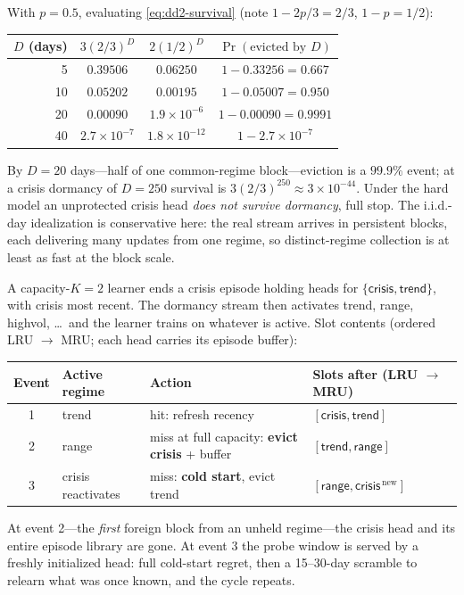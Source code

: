 \begin{example}
With $p = 0.5$, evaluating \eqref{eq:dd2-survival} (note
$1 - 2p/3 = 2/3$, $1 - p = 1/2$):

\begin{center}
\begin{tabular}{rccc}
\toprule
$D$ (days) & $3(2/3)^D$ & $2(1/2)^D$ & $\Pr(\text{evicted by } D)$ \\
\midrule
5  & $0.39506$ & $0.06250$  & $1 - 0.33256 = 0.667$ \\
10 & $0.05202$ & $0.00195$  & $1 - 0.05007 = 0.950$ \\
20 & $0.00090$ & $1.9\times 10^{-6}$ & $1 - 0.00090 = 0.9991$ \\
40 & $2.7\times 10^{-7}$ & $1.8\times 10^{-12}$ & $1 - 2.7\times 10^{-7}$ \\
\bottomrule
\end{tabular}
\end{center}

By $D = 20$ days---half of one common-regime block---eviction is a $99.9\%$
event; at a crisis dormancy of $D = 250$ survival is
$3(2/3)^{250} \approx 3 \times 10^{-44}$. Under the hard model an
unprotected crisis head \emph{does not survive dormancy}, full stop. The
i.i.d.-day idealization is conservative here: the real stream arrives in
persistent blocks, each delivering many updates from one regime, so
distinct-regime collection is at least as fast at the block scale.
\end{example}

\begin{example}
\label{ex:dd2-lru}
A capacity-$K{=}2$ learner ends a crisis episode holding heads for
$\{\textsf{crisis}, \textsf{trend}\}$, with \textsf{crisis} most recent.
The dormancy stream then activates \textsf{trend}, \textsf{range},
\textsf{highvol}, \ldots\ and the learner trains on whatever is active. Slot
contents (ordered LRU $\to$ MRU; each head carries its episode buffer):

\begin{center}
\begin{tabular}{clll}
\toprule
Event & Active regime & Action & Slots after (LRU $\to$ MRU) \\
\midrule
1 & \textsf{trend}   & hit: refresh recency & $[\textsf{crisis}, \textsf{trend}]$ \\
2 & \textsf{range}   & miss at full capacity: \textbf{evict \textsf{crisis}} + buffer & $[\textsf{trend}, \textsf{range}]$ \\
3 & \textsf{crisis} reactivates & miss: \textbf{cold start}, evict \textsf{trend} & $[\textsf{range}, \textsf{crisis}^{\,\text{new}}]$ \\
\bottomrule
\end{tabular}
\end{center}

At event 2---the \emph{first} foreign block from an unheld regime---the
crisis head and its entire episode library are gone. At event 3 the probe
window is served by a freshly initialized head: full cold-start regret, then
a 15--30-day scramble to relearn what was once known, and the cycle repeats.
\end{example}

